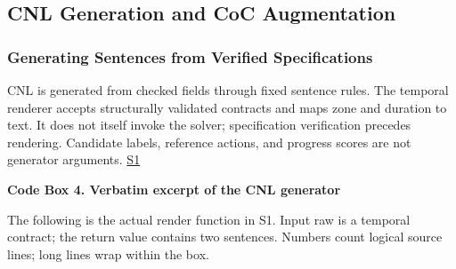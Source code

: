 \documentclass[nolineno]{ieeeaccess}
\begin{document}
\subsection{CNL Generation and CoC Augmentation}

\subsubsection{Generating Sentences from Verified Specifications}

CNL is generated from checked fields through fixed sentence rules. The temporal renderer accepts structurally validated contracts and maps zone and duration to text. It does not itself invoke the solver; specification verification precedes rendering. Candidate labels, reference actions, and progress scores are not generator arguments. \href{\detokenize{projects/04-guardsynth-coc/experiments/paper1_cnl_learning/temporal_preservation.py}}{S1}\par

\textbf{Code Box 4. Verbatim excerpt of the CNL generator}\par

The following is the actual render function in S1. Input raw is a temporal contract; the return value contains two sentences. Numbers count logical source lines; long lines wrap within the box.\par
\end{document}
